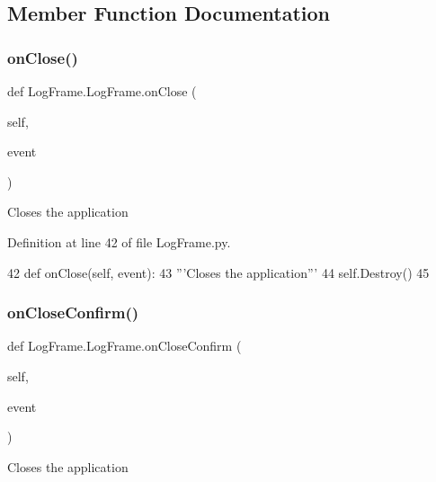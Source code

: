\subsection{Member Function Documentation}
\mbox{\label{classLogFrame_1_1LogFrame_afa3d32e2694b9e5a50279cbaf31cddba}} 
\subsubsection{\texorpdfstring{on\+Close()}{onClose()}}
{\footnotesize\ttfamily def Log\+Frame.\+Log\+Frame.\+on\+Close (\begin{DoxyParamCaption}\item[{}]{self,  }\item[{}]{event }\end{DoxyParamCaption})}

\begin{DoxyVerb}Closes the application\end{DoxyVerb}
 

Definition at line 42 of file Log\+Frame.\+py.


\begin{DoxyCode}
42     \textcolor{keyword}{def }onClose(self, event):
43         \textcolor{stringliteral}{'''Closes the application'''}
44         self.Destroy()
45 
\end{DoxyCode}
\mbox{\label{classLogFrame_1_1LogFrame_a79ee5eea72f19f0a14aa047123125e1e}} 
\subsubsection{\texorpdfstring{on\+Close\+Confirm()}{onCloseConfirm()}}
{\footnotesize\ttfamily def Log\+Frame.\+Log\+Frame.\+on\+Close\+Confirm (\begin{DoxyParamCaption}\item[{}]{self,  }\item[{}]{event }\end{DoxyParamCaption})}

\begin{DoxyVerb}Closes the application\end{DoxyVerb}
 

